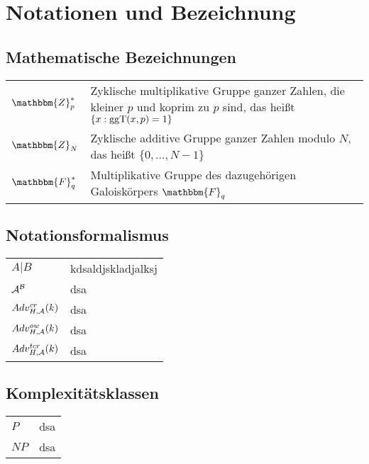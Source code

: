 \chapter{Notationen und Bezeichnung}
\section{Mathematische Bezeichnungen}

\setlength{\tabcolsep}{12pt}
\def\arraystretch{1.5}%
\begin{tabular}{l|l}
	$\mathbbm{Z}^{\ast}_p$ & Zyklische multiplikative Gruppe ganzer Zahlen, die kleiner $p$ und koprim zu $p$ sind, das heißt $\{x : \operatorname{ggT}(x, p) = 1\}$\\
	$\mathbbm{Z}_N$ & Zyklische additive Gruppe ganzer Zahlen modulo $N$, das heißt $\{0, \dots, N-1\}$\\
	$\mathbbm{F}^{\ast}_q$ & Multiplikative Gruppe des dazugehörigen Galoiskörpers $\mathbbm{F}_q$
\end{tabular}

\section{Notationsformalismus}
\begin{tabular}{l|l}
	$A \vert B$ & kdsaldjskladjalksj\\
	$\mathcal{A}^{\mathcal{B}}$ &dsa\\
	$Adv^{cr}_{H,\mathcal{A}}(k)$ & dsa \\
	$Adv^{ow}_{H,\mathcal{A}}(k)$ & dsa \\
	$Adv^{tcr}_{H,\mathcal{A}}(k)$ & dsa
\end{tabular}

\section{Komplexitätsklassen}
\begin{tabular}{l|l}
	$P$ & dsa \\
	$NP$ & dsa
\end{tabular}

